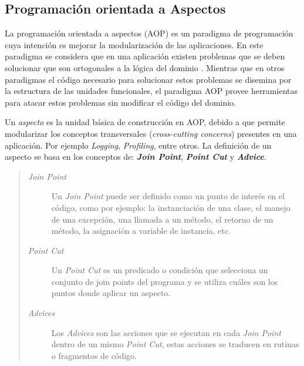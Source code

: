 \subsection{Programación orientada a Aspectos}

	La programación orientada a aspectos (AOP) es un paradigma de programación cuya
	intención es mejorar la modularización de las aplicaciones.
	En este paradigma se considera que en una aplicación existen problemas 
	que se deben solucionar que son ortogonales a la lógica del dominio \cite{Kicz97a}.
	Mientras que en otros paradigmas el código necesario para solucionar estos problemas 
	se disemina por la estructura de las unidades funcionales,
	el paradigma AOP provee herramientas para atacar estos problemas sin modificar el código del dominio.

	\bigskip
	
	Un \emph{aspecto} es la unidad básica de construcción en AOP, debido a que permite
	modularizar los conceptos transversales (\emph{cross-cutting concerns}) presentes en una aplicación.
	Por ejemplo \emph{Logging}, \emph{Profiling}, entre otros.
	La definición de un aspecto se basa en los conceptos de: {\bf \emph{Join
	Point}}, {\bf \emph{ Point Cut}} y {\bf \emph{ Advice}}.
	
	\begin{quote}
	
	\begin{description}
		\item[\emph{Join Point}] Un \emph{Join Point} puede ser definido como un punto
		de interés en el código, como por ejemplo: la instanciación de una clase, el manejo de una
		excepción, una llamada a un método, el retorno de un método, la asignación a variable de instancia, etc.
		
		\item[\emph{Point Cut}] Un \emph{Point Cut} es un predicado o condición que selecciona un conjunto 
		de join points del programa y se utiliza cuáles son los puntos donde aplicar un aspecto.
		
		\item[\emph{Advices}] Los \emph{Advices} son las acciones que se ejecutan en cada \emph{Join Point} dentro de un mismo
		\emph{Point Cut}, estas acciones se traducen en rutinas o fragmentos de código.
	
	\end{description}
	\end{quote}
